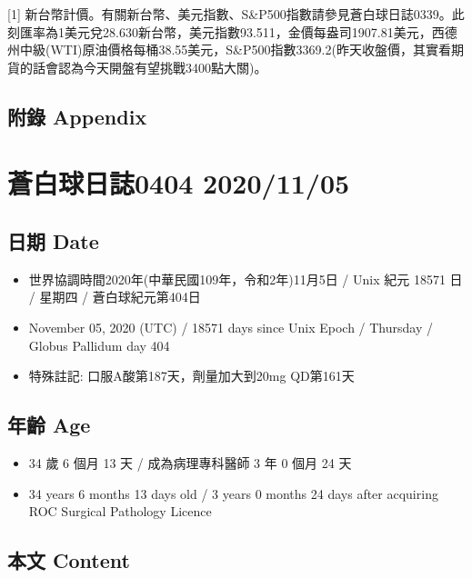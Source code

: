 \documentclass[a5paper, 11pt
]{book}
\providecommand{\tightlist}{%
  \setlength{\itemsep}{0pt}\setlength{\parskip}{0pt}}
\begin{document}
{[}1{]}
新台幣計價。有關新台幣、美元指數、S\&P500指數請參見蒼白球日誌0339。此刻匯率為1美元兌28.630新台幣，美元指數93.511，金價每盎司1907.81美元，西德州中級(WTI)原油價格每桶38.55美元，S\&P500指數3369.2(昨天收盤價，其實看期貨的話會認為今天開盤有望挑戰3400點大關)。

\hypertarget{ux9644ux9304-appendix-61}{%
\subsection{附錄 Appendix}\label{ux9644ux9304-appendix-61}}

\hypertarget{ux84bcux767dux7403ux65e5ux8a8c0404-20201105}{%
\section{蒼白球日誌0404
2020/11/05}\label{ux84bcux767dux7403ux65e5ux8a8c0404-20201105}}

\hypertarget{ux65e5ux671f-date-62}{%
\subsection{日期 Date}\label{ux65e5ux671f-date-62}}

\begin{itemize}
\tightlist
\item
  世界協調時間2020年(中華民國109年，令和2年)11月5日 / Unix 紀元 18571 日
  / 星期四 / 蒼白球紀元第404日
\item
  November 05, 2020 (UTC) / 18571 days since Unix Epoch / Thursday /
  Globus Pallidum day 404
\item
  特殊註記: 口服A酸第187天，劑量加大到20mg QD第161天
\end{itemize}

\hypertarget{ux5e74ux9f61-age-62}{%
\subsection{年齡 Age}\label{ux5e74ux9f61-age-62}}

\begin{itemize}
\tightlist
\item
  34 歲 6 個月 13 天 / 成為病理專科醫師 3 年 0 個月 24 天
\item
  34 years 6 months 13 days old / 3 years 0 months 24 days after
  acquiring ROC Surgical Pathology Licence
\end{itemize}

\hypertarget{ux672cux6587-content-62}{%
\subsection{本文 Content}\label{ux672cux6587-content-62}}
\end{document}

